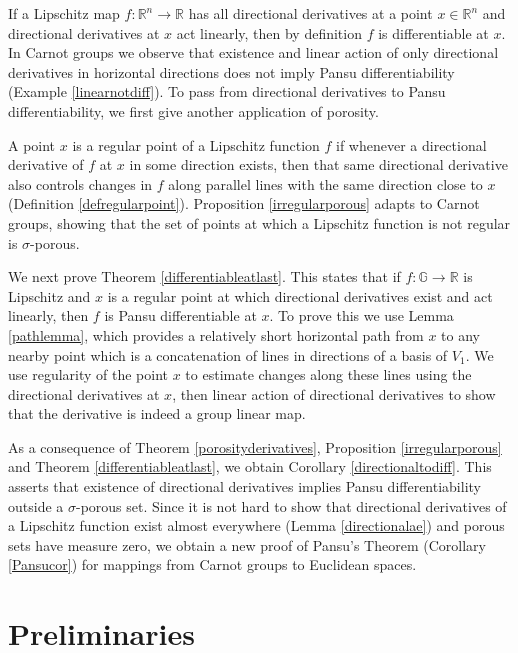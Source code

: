\documentclass[reqno, 11pt]{amsart}
\theoremstyle{definition}
\theoremstyle{remark}
\numberwithin{theorem}{section}
\numberwithin{equation}{section}
\begin{document}
If a Lipschitz map $f\colon \mathbb{R}^{n}\to \mathbb{R}$ has all directional derivatives at a point $x\in \mathbb{R}^n$ and directional derivatives at $x$ act linearly, then by definition $f$ is differentiable at $x$. In Carnot groups we observe that existence and linear action of only directional derivatives in horizontal directions does not imply Pansu differentiability (Example \ref{linearnotdiff}). To pass from directional derivatives to Pansu differentiability, we first give another application of porosity. 

A point $x$ is a regular point of a Lipschitz function $f$ if whenever a directional derivative of $f$ at $x$ in some direction exists, then that same directional derivative also controls changes in $f$ along parallel lines with the same direction close to $x$ (Definition \ref{defregularpoint}). Proposition \ref{irregularporous} adapts \cite[Proposition 3.3]{LP03} to Carnot groups, showing that the set of points at which a Lipschitz function is not regular is $\sigma$-porous. 

We next prove Theorem \ref{differentiableatlast}. This states that if $f\colon \mathbb{G}\to \mathbb{R}$ is Lipschitz and $x$ is a regular point at which directional derivatives exist and act linearly, then $f$ is Pansu differentiable at $x$. To prove this we use Lemma \ref{pathlemma}, which provides a relatively short horizontal path from $x$ to any nearby point which is a concatenation of lines in directions of a basis of $V_{1}$. We use regularity of the point $x$ to estimate changes along these lines using the directional derivatives at $x$, then linear action of directional derivatives to show that the derivative is indeed a group linear map.

As a consequence of Theorem \ref{porosityderivatives}, Proposition \ref{irregularporous} and Theorem \ref{differentiableatlast}, we obtain Corollary \ref{directionaltodiff}. This asserts that existence of directional derivatives implies Pansu differentiability outside a $\sigma$-porous set. Since it is not hard to show that directional derivatives of a Lipschitz function exist almost everywhere (Lemma \ref{directionalae}) and porous sets have measure zero, we obtain a new proof of Pansu's Theorem (Corollary \ref{Pansucor}) for mappings from Carnot groups to Euclidean spaces.

\section{Preliminaries}
\end{document}
